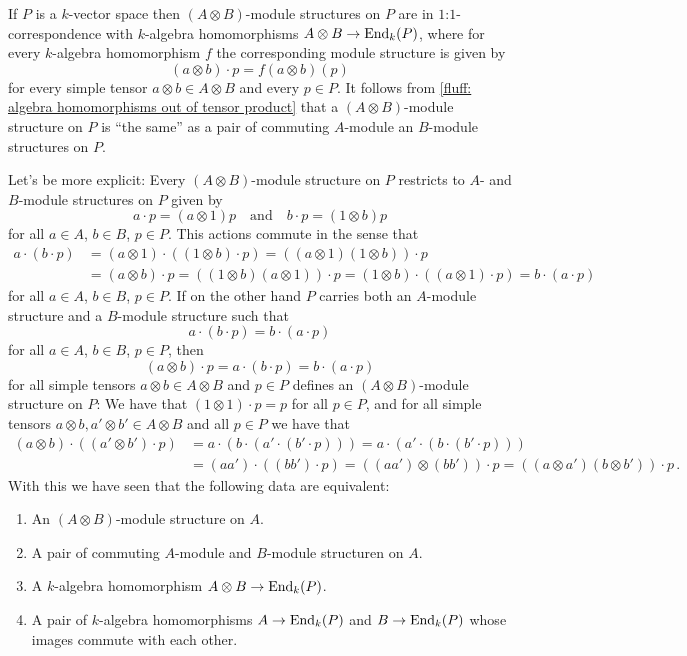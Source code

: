 \begin{fluff}
  \label{fluff: commuting modules structures for tensor products}
  If $P$ is a $k$-vector space then $(A \otimes B)$-module structures on $P$ are in $1$:$1$-correspondence with $k$-algebra homomorphisms $A \otimes B \to \operatorname{End}_k(P)$, where for every $k$-algebra homomorphism $f$ the corresponding module structure is given by
  \[
      (a \otimes b) \cdot p
    = f(a \otimes b)(p)
  \]
  for every simple tensor $a \otimes b \in A \otimes B$ and every $p \in P$.
  It follows from \ref{fluff: algebra homomorphisms out of tensor product} that a $(A \otimes B)$-module structure on $P$ is \enquote{the same} as a pair of commuting $A$-module an $B$-module structures on $P$.
  
  Let’s be more explicit:
  Every $(A \otimes B)$-module structure on $P$ restricts to $A$- and $B$-module structures on $P$ given by
  \[
      a \cdot p
    = (a \otimes 1) p
    \quad\text{and}\quad
      b \cdot p
    = (1 \otimes b) p
  \]
  for all $a \in A$, $b \in B$, $p \in P$.
  This actions commute in the sense that
  \begin{align*}
        a \cdot (b \cdot p)
    &=  (a \otimes 1) \cdot ( (1 \otimes b) \cdot p )
     =  ((a \otimes 1) (1 \otimes b)) \cdot p \\
    &=  (a \otimes b) \cdot p
     =  ((1 \otimes b) (a \otimes 1)) \cdot p
     =  (1 \otimes b) \cdot ( (a \otimes 1) \cdot p )
     =  b \cdot (a \cdot p)
  \end{align*}
  for all $a \in A$, $b \in B$, $p \in P$.
  If on the other hand $P$ carries both an $A$-module structure and a $B$-module structure such that
  \[
      a \cdot (b \cdot p)
    = b \cdot (a \cdot p)
  \]
  for all $a \in A$, $b \in B$, $p \in P$, then
  \[
      (a \otimes b) \cdot p
    = a \cdot (b \cdot p)
    = b \cdot (a \cdot p)
  \]
  for all simple tensors $a \otimes b \in A \otimes B$ and $p \in P$ defines an $(A \otimes B)$-module structure on $P$:
  We have that $(1 \otimes 1) \cdot p = p$ for all $p \in P$, and for all simple tensors $a \otimes b, a' \otimes b' \in A \otimes B$ and all $p \in P$ we have that
  \begin{align*}
        (a \otimes b) \cdot ( (a' \otimes b') \cdot p )
    &=  a \cdot (b \cdot (a' \cdot (b' \cdot p)))
     =  a \cdot (a' \cdot (b \cdot (b' \cdot p))) \\
    &=  (aa') \cdot ( (bb') \cdot p )
     =  ((aa') \otimes (bb')) \cdot p
     =  ( (a \otimes a') (b \otimes b') ) \cdot p \,.
  \end{align*}
  With this we have seen that the following data are equivalent:
  \begin{enumerate}
    \item
      An $(A \otimes B)$-module structure on $A$.
    \item
      A pair of commuting $A$-module and $B$-module structuren on $A$.
    \item
      A $k$-algebra homomorphism $A \otimes B \to \operatorname{End}_k(P)$.
    \item
      A pair of $k$-algebra homomorphisms $A \to \operatorname{End}_k(P)$ and $B \to \operatorname{End}_k(P)$ whose images commute with each other.
  \end{enumerate}
  

\end{fluff}
